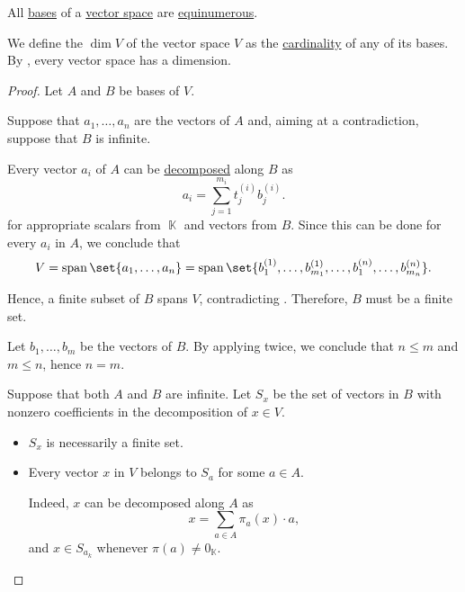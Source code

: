 \begin{proposition}\label{thm:vector_space_dimension}
  All \hyperref[def:hamel_basis]{bases} of a \hyperref[def:vector_space]{vector space} are \hyperref[def:equinumerosity]{equinumerous}.

  We define the  \( \dim V \) of the vector space \( V \) as the \hyperref[thm:cardinality_existence]{cardinality} of any of its bases. By , every vector space has a dimension.
\end{proposition}
\begin{proof}
  Let \( A \) and \( B \) be bases of \( V \).

   Suppose that \( a_1, \ldots, a_n \) are the vectors of \( A \) and, aiming at a contradiction, suppose that \( B \) is infinite.

  Every vector \( a_i \) of \( A \) can be \hyperref[def:basis_decomposition]{decomposed} along \( B \) as
  \begin{equation*}
    a_i = \sum_{j=1}^{m_i} t^{(i)}_j b^{(i)}_j.
  \end{equation*}
  for appropriate scalars from \( \BbbK \) and vectors from \( B \). Since this can be done for every \( a_i \) in \( A \), we conclude that
  \begin{equation*}
    V = \linspan\set{ a_1, \ldots, a_n } = \linspan\set{ b^{(1)}_1, \ldots, b^{(1)}_{m_1}, \ldots, b^{(n)}_1, \ldots, b^{(n)}_{m_n} }.
  \end{equation*}

  Hence, a finite subset of \( B \) spans \( V \), contradicting . Therefore, \( B \) must be a finite set.

  Let \( b_1, \ldots, b_m \) be the vectors of \( B \). By applying  twice, we conclude that \( n \leq m \) and \( m \leq n \), hence \( n = m \).

   Suppose that both \( A \) and \( B \) are infinite. Let \( S_x \) be the set of vectors in \( B \) with nonzero coefficients in the decomposition of \( x \in V \).
  \begin{itemize}
    \item \( S_x \) is necessarily a finite set.
    \item Every vector \( x \) in \( V \) belongs to \( S_a \) for some \( a \in A \).

    Indeed, \( x \) can be decomposed along \( A \) as
    \begin{equation*}
      x = \sum_{a \in A} \pi_a(x) \cdot a,
    \end{equation*}
    and \( x \in S_{a_k} \) whenever \( \pi(a) \neq 0_\BbbK \).


\end{itemize}
\end{proof}
